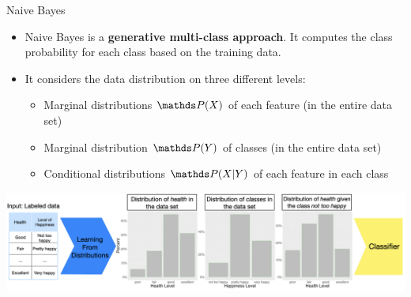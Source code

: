\documentclass[11pt,compress,t,notes=noshow, xcolor=table]{beamer}
\begin{document}
\begin{vbframe}{Naive Bayes}
\begin{itemize}
\item \small Naive Bayes is a \textbf{generative multi-class approach}. It computes the class probability for each class based on the training data.
\item \small It considers the data distribution on three different levels:
    \begin{itemize}
    \item \small Marginal distributions $\P(X)$ of each feature (in the entire data set)
    \item \small Marginal distribution $\P(Y)$ of classes (in the entire data set)
    \item \small Conditional distributions $\P(X|Y)$ of each feature in each class
    \end{itemize}
\vspace*{1cm}
\end{itemize}
\begin{center}
  \includegraphics[width=1\textwidth]{slides/supervised-classification/figure_man/nutshell-classif-distributions_learning.png}
\end{center}


\end{vbframe}
\end{document}
